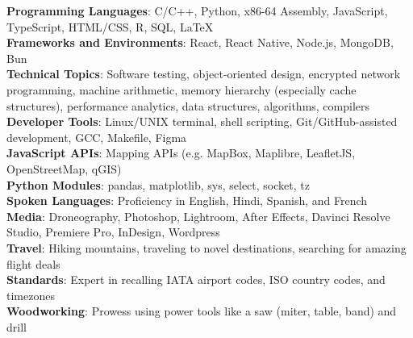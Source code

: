 \begin{itemize}[leftmargin=0in, label={}]
    \small{\item{
     \textbf{Programming Languages}{: C/C++, Python, x86-64 Assembly, JavaScript, TypeScript, HTML/CSS, R, SQL, LaTeX} \\
     \textbf{Frameworks and Environments}{: React, React Native, Node.js, MongoDB, Bun} \\
     \textbf{Technical Topics}{: Software testing, object-oriented design,
     encrypted network programming, machine arithmetic, memory hierarchy
     (especially cache structures), performance analytics, data structures,
     algorithms, compilers} \\
     \textbf{Developer Tools}{: Linux/UNIX terminal, shell scripting,
     Git/GitHub-assisted development, GCC, Makefile, Figma} \\
     \textbf{JavaScript APIs}{: Mapping APIs (e.g. MapBox, Maplibre, LeafletJS,
     OpenStreetMap, qGIS)} \\
     \textbf{Python Modules}{: pandas, matplotlib, sys, select, socket, tz} \\
     \textbf{Spoken Languages}{: Proficiency in English, Hindi, Spanish, and French} \\
     \textbf{Media}{: Droneography, Photoshop, Lightroom, After Effects, Davinci Resolve Studio, Premiere Pro, InDesign, Wordpress} \\
     \textbf{Travel}{: Hiking mountains, traveling to novel destinations, searching for amazing flight deals} \\
     \textbf{Standards}{: Expert in recalling IATA airport codes, ISO country codes, and timezones} \\
     \textbf{Woodworking}{: Prowess using power tools like a saw (miter, table, band) and drill} \\
     
    }}
\end{itemize}